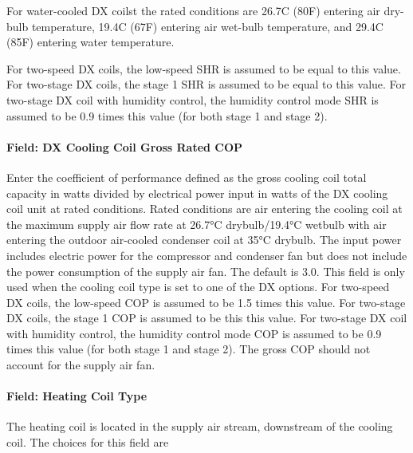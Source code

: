 For water-cooled DX coilst the rated conditions are 26.7C (80F) entering air dry-bulb temperature, 19.4C (67F) entering air wet-bulb temperature, and 29.4C (85F) entering water temperature.

For two-speed DX coils, the low-speed SHR is assumed to be equal to this value. For two-stage DX coils, the stage 1 SHR is assumed to be equal to this value. For two-stage DX coil with humidity control, the humidity control mode SHR is assumed to be 0.9 times this value (for both stage 1 and stage 2).

\paragraph{Field: DX Cooling Coil Gross Rated COP}\label{field-dx-cooling-coil-gross-rated-cop}

Enter the coefficient of performance defined as the gross cooling coil total capacity in watts divided by electrical power input in watts of the DX cooling coil unit at rated conditions. Rated conditions are air entering the cooling coil at the maximum supply air flow rate at 26.7°C drybulb/19.4°C wetbulb with air entering the outdoor air-cooled condenser coil at 35°C drybulb. The input power includes electric power for the compressor and condenser fan but does not include the power consumption of the supply air fan. The default is 3.0. This field is only used when the cooling coil type is set to one of the DX options. For two-speed DX coils, the low-speed COP is assumed to be 1.5 times this value. For two-stage DX coils, the stage 1 COP is assumed to be this this value. For two-stage DX coil with humidity control, the humidity control mode COP is assumed to be 0.9 times this value (for both stage 1 and stage 2). The gross COP should not account for the supply air fan.

\paragraph{Field: Heating Coil Type}\label{field-heating-coil-type-3}

The heating coil is located in the supply air stream, downstream of the cooling coil. The choices for this field are

